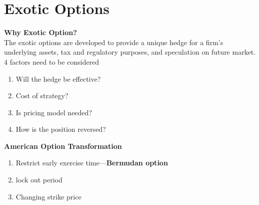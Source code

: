 \documentclass[11pt,fleqn]{report} %
\numberwithin{equation}{section} %
\numberwithin{figure}{section} %
\numberwithin{table}{section} %
\begin{document}
\chapter{Exotic Options}
\begin{definition}\textbf{Why Exotic Option?}\\
The exotic options are developed to provide a unique hedge for a firm's underlying assets, tax and regulatory purposes, and speculation on future market. 4 factors need to be considered
\begin{enumerate}
    \item Will the hedge be effective?
    \item Cost of strategy?
    \item Is pricing model needed?
    \item How is the position reversed?
\end{enumerate}
\end{definition}
\begin{definition}\textbf{American Option Transformation}
\begin{enumerate}
    \item Restrict early exercise time---\textbf{Bermudan option}
    \item lock out period
    \item Changing strike price
\end{enumerate}
\end{definition}
\end{document}
